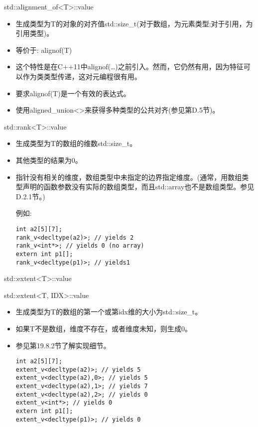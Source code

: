 std::alignment\_of<T>::value

\begin{itemize}
\item 
生成类型为T的对象的对齐值std::size\_t(对于数组，为元素类型;对于引用，为引用类型)。

\item 
等价于: alignof(T)

\item 
这个特性是在C++11中alignof(…)之前引入。然而，它仍然有用，因为特征可以作为类类型传递，这对元编程很有用。

\item 
要求alignof(T)是一个有效的表达式。

\item 
使用aligned\_union<>来获得多种类型的公共对齐(参见第D.5节)。
\end{itemize}

std::rank<T>::value

\begin{itemize}
\item 
生成类型为T的数组的维数std::size\_t。

\item 
其他类型的结果为0。

\item 
指针没有相关的维度，数组类型中未指定的边界指定维度。(通常，用数组类型声明的函数参数没有实际的数组类型，而且std::array也不是数组类型。参见D.2.1节。)

例如:
\begin{lstlisting}[style=styleCXX]
int a2[5][7];
rank_v<decltype(a2)>; // yields 2
rank_v<int*>; // yields 0 (no array)
extern int p1[];
rank_v<decltype(p1)>; // yields1
\end{lstlisting}
\end{itemize}

std::extent<T>::value

std::extent<T, IDX>::value

\begin{itemize}
\item 
生成类型为T的数组的第一个或第idx维的大小为std::size\_t。

\item 
如果T不是数组，维度不存在，或者维度未知，则生成0。

\item 
参见第19.8.2节了解实现细节。

\begin{lstlisting}[style=styleCXX]
int a2[5][7];
extent_v<decltype(a2)>; // yields 5
extent_v<decltype(a2),0>; // yields 5
extent_v<decltype(a2),1>; // yields 7
extent_v<decltype(a2),2>; // yields 0
extent_v<int*>; // yields 0
extern int p1[];
extent_v<decltype(p1)>; // yields 0
\end{lstlisting}
\end{itemize}


